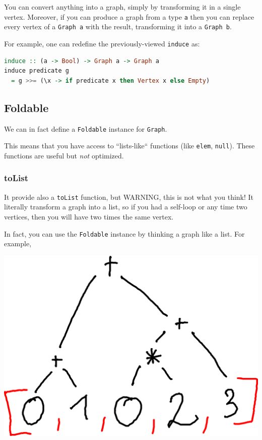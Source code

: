 \documentclass[10pt,a4paper]{article}
\begin{document}
You can convert anything into a graph, simply by transforming it in a single vertex. Moreover, if you can produce a graph from a type \verb|a| then you can replace every vertex of a \verb|Graph a| with the result, transforming it into a \verb|Graph b|.

For example, one can redefine the previously-viewed \verb|induce| as:

\begin{lstlisting}[language=Haskell, frame=single]
induce :: (a -> Bool) -> Graph a -> Graph a
induce predicate g
  = g >>= (\x -> if predicate x then Vertex x else Empty)
\end{lstlisting}

\subsection{Foldable}
We can in fact define a \verb|Foldable| instance for \verb|Graph|.

This means that you have access to ``lists-like`` functions (like \verb|elem|, \verb|null|). These functions are useful but \emph{not} optimized.

\subsubsection{toList}
It provide also a \verb|toList| function, but WARNING, this is not what you think! It literally transform a graph into a list, so if you had a self-loop or any time two vertices, then you will have two times the same vertex.

In fact, you can use the \verb|Foldable| instance by thinking a graph like a list. For example,

\begin{center}
	\includegraphics[scale=0.5]{figspng/foldable.png}
\end{center}
\end{document}
